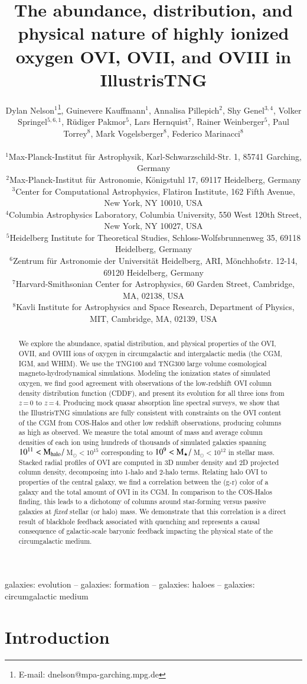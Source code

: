 \documentclass[useAMS,usenatbib]{mnras}
\title[IllustrisTNG: Highly Ionized Oxygen]{The abundance, distribution, and physical nature of highly ionized oxygen OVI, OVII, and OVIII in IllustrisTNG}
\author[D. Nelson et al.]{Dylan Nelson$^{1}$\thanks{E-mail: dnelson@mpa-garching.mpg.de},
Guinevere Kauffmann$^{1}$,
Annalisa Pillepich$^{2}$, 
Shy Genel$^{3,4}$, \newauthor
Volker Springel$^{5,6,1}$,
R{\"u}diger Pakmor$^{5}$, 
Lars Hernquist$^{7}$, 
Rainer Weinberger$^{5}$, \newauthor
Paul Torrey$^{8}$, 
Mark Vogelsberger$^{8}$, 
Federico Marinacci$^{8}$ \\\\
%
$^{1}$Max-Planck-Institut f\"{u}r Astrophysik, Karl-Schwarzschild-Str. 1, 85741 Garching, Germany\\
$^{2}$Max-Planck-Institut f\"{u}r Astronomie, K\"{o}nigstuhl 17, 69117 Heidelberg, Germany\\
$^{3}$Center for Computational Astrophysics, Flatiron Institute, 162 Fifth Avenue, New York, NY 10010, USA\\
$^{4}$Columbia Astrophysics Laboratory, Columbia University, 550 West 120th Street, New York, NY 10027, USA\\
$^{5}$Heidelberg Institute for Theoretical Studies, Schloss-Wolfsbrunnenweg 35, 69118 Heidelberg, Germany\\
$^{6}$Zentrum f\"{u}r Astronomie der Universit\"{a}t Heidelberg, ARI, M\"{o}nchhofstr. 12-14, 69120 Heidelberg, Germany\\
$^{7}$Harvard-Smithsonian Center for Astrophysics, 60 Garden Street, Cambridge, MA, 02138, USA\\
$^{8}$Kavli Institute for Astrophysics and Space Research, Department of Physics, MIT, Cambridge, MA, 02139, USA\\
}
\newcommand{\msun}{\,M$_{\odot}$\xspace}
\newcommand{\ovi}{OVI\xspace}
\newcommand{\ovii}{OVII\xspace}
\newcommand{\oviii}{OVIII\xspace}
\begin{document}
\maketitle

\begin{abstract}
We explore the abundance, spatial distribution, and physical properties of the \ovi, \ovii, and \oviii ions of oxygen in circumgalactic and intergalactic media (the CGM, IGM, and WHIM). We use the TNG100 and TNG300 large volume cosmological magneto-hydrodynamical simulations. Modeling the ionization states of simulated oxygen, we find good agreement with observations of the low-redshift \ovi column density distribution function (CDDF), and present its evolution for all three ions from $z$\,=\,0 to $z$\,=\,4. Producing mock quasar absorption line spectral surveys, we show that the IllustrisTNG simulations are fully consistent with constraints on the \ovi content of the CGM from COS-Halos and other low redshift observations, producing columns as high as observed. We measure the total amount of mass and average column densities of each ion using hundreds of thousands of simulated galaxies spanning \mbox{$10^{11} < \rm{M}_{\rm halo}/$\msun$ < 10^{15}$} corresponding to \mbox{$10^{9} < \rm{M}_{\rm \star}/$\msun$ < 10^{12}$} in stellar mass. Stacked radial profiles of \ovi are computed in 3D number density and 2D projected column density, decomposing into 1-halo and 2-halo terms. Relating halo \ovi to properties of the central galaxy, we find a correlation between the (g-r) color of a galaxy and the total amount of \ovi in its CGM. In comparison to the COS-Halos finding, this leads to a dichotomy of columns around star-forming versus passive galaxies at \textit{fixed} stellar (or halo) mass. We demonstrate that this correlation is a direct result of blackhole feedback associated with quenching and represents a causal consequence of galactic-scale baryonic feedback impacting the physical state of the circumgalactic medium.
\end{abstract}

\begin{keywords}
galaxies: evolution -- galaxies: formation -- galaxies: haloes -- galaxies: circumgalactic medium
\end{keywords}


\section{Introduction}
\end{document}
